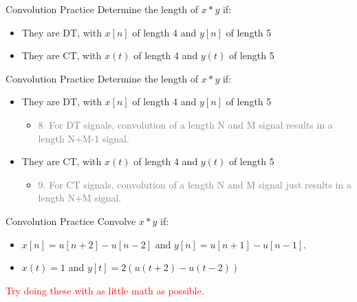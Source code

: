 \begin{frame}{Convolution Practice}
    Determine the length of $x*y$ if: 
    \begin{itemize}
        \item They are DT, with $x[n]$ of length 4 and $y[n]$ of length 5
        \item They are CT, with $x(t)$ of length 4 and $y(t)$ of length 5
    \end{itemize}
\end{frame}

\begin{frame}{Convolution Practice}
    Determine the length of $x*y$ if: 
    \begin{itemize}
        \item They are DT, with $x[n]$ of length 4 and $y[n]$ of length 5
        \begin{itemize} 
            \item \textcolor{gray}{8. For DT signals, convolution of a length N and M signal results in a length N+M-1 signal.}
        \end{itemize}
        \item They are CT, with $x(t)$ of length 4 and $y(t)$ of length 5
        \begin{itemize} 
            \item \textcolor{gray}{9. For CT signals, convolution of a length N and M signal just results in a length N+M signal.}
        \end{itemize}
    \end{itemize}
\end{frame}

\begin{frame}{Convolution Practice}
    Convolve $x*y$ if: 
    \begin{itemize}
        \item $x[n] = u[n+2]-u[n-2]$ and $y[n]=u[n+1]-u[n-1]$.
        \item $x(t) = 1$ and $y[t] = 2(u(t+2)-u(t-2))$
    \end{itemize}
    \textcolor{red}{Try doing these with as little math as possible.}
\end{frame}

